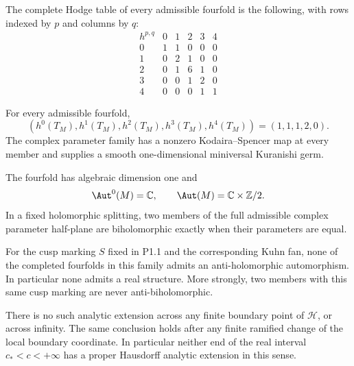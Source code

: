 \begin{theorem}\label{night:P1A.2}
The complete Hodge table of every admissible fourfold is the
following, with rows indexed by $p$ and columns by $q$:
\[
\begin{array}{c|ccccc}
h^{p,q}&0&1&2&3&4\\\hline
0&1&1&0&0&0\\
1&0&2&1&0&0\\
2&0&1&6&1&0\\
3&0&0&1&2&0\\
4&0&0&0&1&1
\end{array}
\]
\end{theorem}

\begin{theorem}\label{night:P1A.3}
For every admissible fourfold,
\[
 (h^0(T_M),h^1(T_M),h^2(T_M),h^3(T_M),h^4(T_M))
 =(1,1,1,2,0).
\]
The complex parameter family has a nonzero Kodaira--Spencer map
at every member and supplies a smooth one-dimensional miniversal
Kuranishi germ.
\end{theorem}

\begin{theorem}\label{night:P1A.4}
The fourfold has algebraic dimension one and
\[
\Aut^0(M)=\mathbb C,\qquad
\Aut(M)=\mathbb C\times\mathbb Z/2.
\]
In a fixed holomorphic splitting, two members of the full
admissible complex parameter half-plane are biholomorphic
exactly when their parameters are equal.
\end{theorem}

\begin{theorem}\label{night:P1.17}
For the cusp marking $S$ fixed in P1.1 and the corresponding Kuhn fan,
none of the completed fourfolds in this family admits an
anti-holomorphic automorphism.  In particular none admits a real
structure.  More strongly, two members with this same cusp marking
are never anti-biholomorphic.
\end{theorem}

\begin{theorem}\label{night:P1A.5}
There is no such analytic extension across any finite boundary
point of $\mathcal H$, or across infinity. The same conclusion
holds after any finite ramified change of the local boundary
coordinate. In particular neither end of the real interval
$c_*<c<+\infty$ has a proper Hausdorff analytic extension in
this sense.
\end{theorem}


